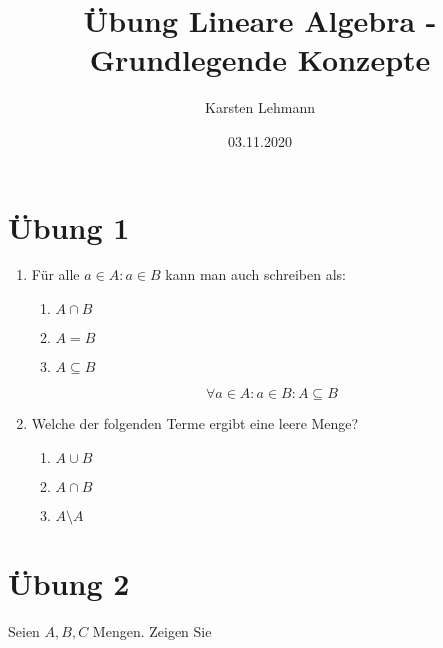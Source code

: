 \documentclass{article}
\author{Karsten Lehmann}
\date{03.11.2020}
\title{Übung Lineare Algebra - Grundlegende Konzepte}
\begin{document}
\maketitle
\newpage

\section*{Übung 1}
\begin{enumerate}
\item Für alle $a \in A \colon a \in B$ kann man auch schreiben als:
  \begin{enumerate}
  \item $A \cap B$
  \item $A = B$
  \item $A \subseteq B$
  \end{enumerate}
  \[
    \forall a \in A \colon a \in B \colon A \subseteq B
  \]
\item Welche der folgenden Terme ergibt eine leere Menge?
  \begin{enumerate}
  \item $A \cup B$
  \item $A \cap B$
  \item $A \setminus A$
  \end{enumerate}
\end{enumerate}

\section*{Übung 2}

Seien $A,B,C$ Mengen. Zeigen Sie
\end{document}
